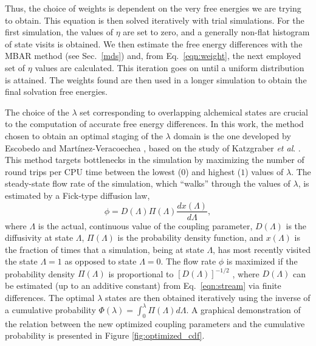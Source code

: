\documentclass[final,12p,times,twocolumn]{elsarticle}
\begin{document}
	Thus, the choice of weights is dependent on the very free energies we are trying to obtain. This equation is then solved iteratively with trial simulations. For the first simulation, the values of $\eta$ are set to zero, and a generally non-flat histogram of state visits is obtained. We then estimate the free energy differences with the MBAR method \cite{mbar} (see Sec.~\ref{mds}) and, from Eq.~\eqref{eqn:weight}, the next employed set of $\eta$ values are calculated. This iteration goes on until a uniform distribution is attained. The weights found are then used in a longer simulation to obtain the final solvation free energies.
	
	The choice of the $\lambda$ set corresponding to overlapping alchemical states are crucial to the computation of accurate free energy differences. In this work, the method chosen to obtain an optimal staging of the $\lambda$ domain is the one developed by Escobedo and Mart\'{i}nez-Veracoechea \cite{escobedo2007}, based on the study of Katzgraber \textit{et al}. \cite{1742-5468-2006-03-P03018}. This method targets bottlenecks in the simulation by maximizing the number of round trips per CPU time between the lowest ($0$) and highest ($1$) values of $\lambda$. The steady-state flow rate of the simulation, which ``walks'' through the values of $\lambda$, is estimated by a Fick-type diffusion law,
	\begin{equation}
	\phi = D(\Lambda) \Pi (\Lambda) \dfrac{dx(\Lambda)}{d \Lambda},
	\label{eqn:stream}
	\end{equation}
	where $\Lambda$ is the actual, continuous value of the coupling parameter, $D(\Lambda)$ is the diffusivity at state $\Lambda$, $\Pi(\Lambda)$ is the probability density function, and $x(\Lambda)$ is the fraction of times that a simulation, being at state $\Lambda$, has most recently visited the state $\Lambda=1$ as opposed to state $\Lambda=0$. The flow rate $\phi$ is maximized if the probability density $\Pi(\Lambda)$ is proportional to $[D(\Lambda)]^{-1/2}$ \cite{escobedo2007,1742-5468-2006-03-P03018}, where $D(\Lambda)$ can be estimated (up to an additive constant) from Eq.~\eqref{eqn:stream} via finite differences. The optimal $\lambda$ states are then obtained iteratively using the inverse of a cumulative probability $\Phi(\lambda) = \int_0^\lambda \Pi(\Lambda) d\Lambda$. A graphical demonstration of the relation between the new optimized coupling parameters and the cumulative probability is presented in Figure \ref{fig:optimized_cdf}.
\end{document}
